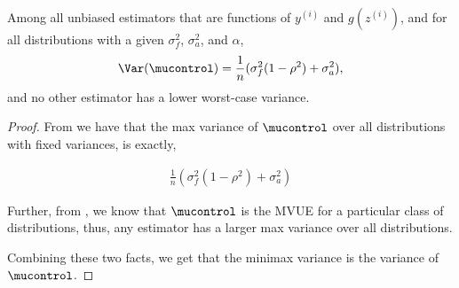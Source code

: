\begin{thm} [\ref{thm:price:main}]
Among all unbiased
  estimators that are functions of $y^{(i)}$ and $g(z^{(i)})$, and for all distributions with a given $\sigma^2_f$, $\sigma^2_a$, and $\alpha$,
\begin{align}
  \Var(\mucontrol) = \frac{1}{n} (\sigma^2_f (1 - \rho^2) + \sigma^2_a),
\end{align}
and no other estimator has a lower worst-case variance.
\end{thm}
\begin{proof}
From  we have that the max variance of $\mucontrol$ over all distributions with fixed variances, is exactly,

\begin{align}
\frac{1}{n} (\sigma^2_f (1 - \rho^2) + \sigma^2_a)
\end{align}

Further, from , we know that $\mucontrol$ is the MVUE for a particular class of distributions, thus, any estimator has a larger max variance over all distributions. 

Combining these two facts, we get that the minimax variance is the variance of $\mucontrol$.
\end{proof}
